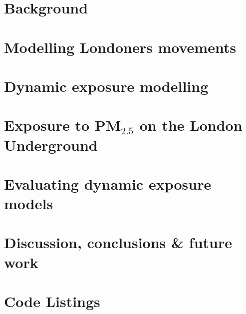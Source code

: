 \documentclass[12pt]{report}
\begin{document}
\chapter{Background}

\label{chap:background}

\label{chap:dynamic_exposure}

\chapter{Modelling Londoners movements}
\label{chap:the_ltdsx}


\chapter{Dynamic exposure modelling}
\label{chap:the_lhem}


\chapter{Exposure to \texorpdfstring{PM$_{2.5}$}{} on the London Underground}
\label{chap:monitoring_on_underground}


\chapter{Evaluating dynamic exposure models}
\label{chap:evaluating_dynamic_exposure_models}


\chapter{Discussion, conclusions \& future work}





\printglossary

\appendix

\chapter{Code Listings}

\end{document}
